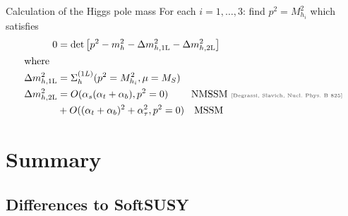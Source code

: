 \documentclass[hyperref={pdfpagelabels=false},ngerman]{beamer}
\newcommand{\mycite}[1]{\textcolor{darkgray}{\tiny [#1]}}
\begin{document}
\begin{frame}{Calculation of the Higgs pole mass}
  For each $i=1,\ldots, 3$: find $p^2=M_{h_i}^2$ which satisfies
  \begin{align*}
    0 &= \det\left[ p^2 - m_{h}^2 - \Delta m_{h,\text{1L}}^2 - \Delta m_{h,\text{2L}}^2 \right]\\
    \intertext{where}
    \Delta m_{h,\text{1L}}^2 &= \Sigma_h^{(1L)}(p^2=M_{h_i}^2, \mu=M_S)\\
    \Delta m_{h,\text{2L}}^2 &= O(\alpha_s(\alpha_t + \alpha_b), p^2=0)\qquad\ \text{NMSSM \mycite{Degrassi, Slavich, Nucl.\ Phys.\ B 825}}\\
    & + O((\alpha_t + \alpha_b)^2 + \alpha_\tau^2, p^2=0)\quad \text{MSSM}
  \end{align*}
\end{frame}

\section{Summary}
\subsection{Differences to SoftSUSY}
\end{document}
